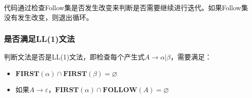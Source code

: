 \documentclass[lang=cn,11pt,a4paper]{elegantpaper}
\begin{document}
代码通过检查Follow集是否发生改变来判断是否需要继续进行迭代。如果Follow集没有发生改变，则退出循环。

\subsubsection{是否满足LL(1)文法}

判断文法是否是LL(1)文法，即检查每个产生式$A\rightarrow\alpha|\beta$，需要满足：

\begin{itemize}
    \item $\mathbf{FIRST}(\alpha)\cap\mathbf{FIRST}(\beta)=\varnothing$
    \item 如果$A\rightarrow\varepsilon$，$\mathbf{FIRST}(\alpha)\cap\mathbf{FOLLOW}(A)=\varnothing$
\end{itemize}
\end{document}
